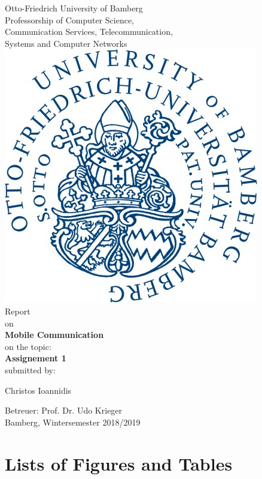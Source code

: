 \documentclass[10pt,a4paper]{article}
\author{Christos Ioannidis, Roman Gressler, Andy Andreas Lewandowski}
\begin{document}
\begin{titlepage}
		\begin{center}
		\small Otto-Friedrich University of Bamberg\\
		\vspace{5mm}
		\LARGE Professorship of Computer Science,\\
		Communication Services, Telecommunication,\\
		Systems and Computer Networks\\
		\vspace{8mm}
		\includegraphics[scale=0.15]{images/uniBaLogo.png}\\
		\vspace{10mm}
		\LARGE Report\\
		\vspace{2mm}
		\small on\\
		\vspace{5mm}
		\LARGE \textbf{Mobile Communication}\\
		\vspace{15mm}
		\normalsize on the topic:\\
		\vspace{5mm}
		\huge \textbf{Assignement 1} \\
		\vspace{5mm}
		\small submitted by:\\
		\vspace{5mm}
		
		Christos Ioannidis\\
		\vspace{10mm}
		
		\small Betreuer: Prof. Dr. Udo Krieger\\
		\vspace{2mm}
		Bamberg, Wintersemester 2018/2019
		
	\end{center}
\end{titlepage}

\tableofcontents
\newpage


\newpage

\newpage

\newpage
\section{Lists of Figures and Tables}
\end{document}
